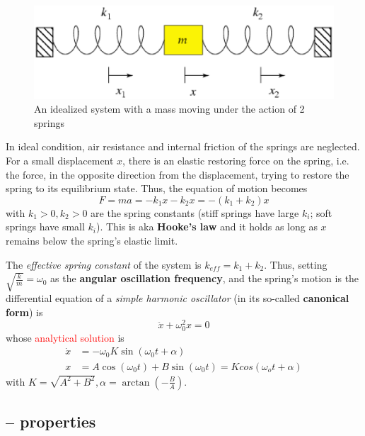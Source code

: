 \begin{figure}[hbt]
 \centerline{\includegraphics[height=3
cm]{./images/mass_2spring.eps}}
 \caption{An idealized system with a mass moving under the action of 2
   springs}
\label{fig:mass_2springs}
\end{figure}

In ideal condition, air resistance and internal friction of the
springs are neglected. For a small displacement $x$, there is an
elastic restoring force on the spring, i.e. the force, in the opposite
direction from the displacement, trying to restore the spring to its
equilibrium state. Thus, the equation of motion becomes
\begin{equation}
  \label{eq:361}
  F=ma = -k_1x-k_2x = -(k_1+k_2)x
\end{equation}
with $k_1>0,k_2>0$ are the spring constants (stiff springs have large
$k_i$;  soft springs have small $k_i$). This is aka {\bf Hooke's law} and it
holds as long as $x$ remains below the spring's elastic limit.

The {\it effective spring constant} of the system is
$k_{eff}=k_1+k_2$. Thus, setting $\sqrt{\frac{k}{m}}=\omega_0$ as the
{\bf angular oscillation frequency}, and the spring's motion is the
differential equation of a {\it simple harmonic oscillator} (in its
so-called {\bf canonical form}) is
\begin{equation}
  \label{eq:363}
  \ddot{x} + \omega^2_0 x = 0
\end{equation}
whose \textcolor{red}{analytical solution} is
\begin{equation}
  \label{eq:364}
  \begin{split}
    \dot{x} &=-\omega_0K\sin(\omega_0t + \alpha)\\
    x &= A\cos(\omega_0t) + B\sin(\omega_0t) = Kcos(\omega_ot+\alpha)
  \end{split}
\end{equation}
with $K=\sqrt{A^2+B^2}, \alpha = \arctan(-\frac{B}{A})$.


\subsection{-- properties}

